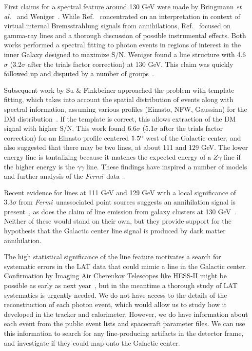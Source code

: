 \documentclass[aps,twocolumn,prd,superscriptaddress,showpacs,nofootinbib,fixfloat]{revtex4}
\newcommand{\Fermi}{{\slshape Fermi}}
\newcommand{\degree}{^{\rm o}}
\begin{document}
First claims for a spectral feature around 130 GeV were made by Bringmann
\textit{et al.}~\citep{Bringmann:2012} and Weniger~\citep{Weniger:2012}. While
Ref.~\citep{Bringmann:2012} concentrated on an interpretation in context of
virtual internal Bremsstrahlung signals from annihilations,
Ref.~\citep{Weniger:2012} focused on gamma-ray lines and a thorough discussion
of possible instrumental effects.  Both works performed a spectral fitting to
photon events in regions of interest in
the inner Galaxy designed to maximize S/N. Weniger found a line structure
with 4.6$\sigma$ (3.2$\sigma$ after the trials factor
correction) at 130 GeV.
This claim was quickly followed up and disputed by a number of
groups~\cite{tempel:2012ey, Boyarsky:2012ca}.

Subsequent work by Su \& Finkbeiner approached the problem
with template fitting, which takes into account the spatial
distribution of events along with spectral information,
assuming various profiles (Einasto, NFW, Gaussian) for the
DM distribution~\citep{linepaper}.  If the template is
correct, this allows extraction of the DM signal with higher
S/N.  This work found 6.6$\sigma$ (5.1$\sigma$ after the
trials factor correction) for an Einasto profile centered
$1.5\degree$ west of the Galactic center, and also suggested
that there may be two lines, at about 111 and 129 GeV.  The
lower energy line is tantalizing because it matches the
expected energy of a $Z\gamma$ line if the higher energy is
the $\gamma\gamma$ line.  These findings have inspired a
number of models and further analysis of the \Fermi\
data~\citep{Dudas:2012, Choi:2012, Kyae:2012, Lee:2012,
Rajaraman:2012, Acharya:2012, Garny:2012, Buckley:2012,
Chu:2012, Kang:2012, Buchmuller:2012, Bergstrom:2012b,
Heo:2012, Park:2012, Tulin:2012, Cline:2012, Weiner:2012,
WeinerYavin:2012b, FanReece:2012, Huang:2012, Whiteson:2012,
Buchmuller:2012, Cholis:2012}.

Recent evidence for lines at 111 GeV and 129 GeV with a
local significance of $3.3\sigma$ from \Fermi\ unassociated
point sources suggests an annihilation signal is
present~\cite{doubleline}\citep[but
see][]{HooperLinden:2012b}, as does the claim of line
emission from galaxy clusters at 130
GeV~\cite{Hektor:2012kc}.  Neither of these would stand on
their own, but they provide support for the hypothesis that
the Galactic center line signal is produced by dark matter
annihilation.

The high statistical significance of the line feature
motivates a search for systematic errors in the LAT data
that could mimic a line in the Galactic center.
Confirmation by Imaging Air Cherenkov Telescopes like
HESS-II might be possible as early as next
year~\cite{Bergstrom:2012}, but in the meantime a thorough
study of LAT systematics is urgently needed.  We do not have
access to the details of the reconstruction of each photon
event, which would allow us to study how it developed in the
tracker and calorimeter.  However, we do have information
about each event from the public event lists and spacecraft
parameter files.  We can use this information to search for
any line-producing artifacts in the detector frame, and
investigate if they could map onto the Galactic center.
\end{document}
